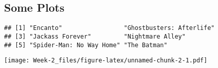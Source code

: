 \documentclass[
]{article}
\begin{document}
\hypertarget{some-plots}{%
\subsection{Some Plots}\label{some-plots}}

\begin{verbatim}
## [1] "Encanto"                 "Ghostbusters: Afterlife"
## [3] "Jackass Forever"         "Nightmare Alley"        
## [5] "Spider-Man: No Way Home" "The Batman"
\end{verbatim}

\texttt{[image: Week-2\_files/figure-latex/unnamed-chunk-2-1.pdf]}
\end{document}
